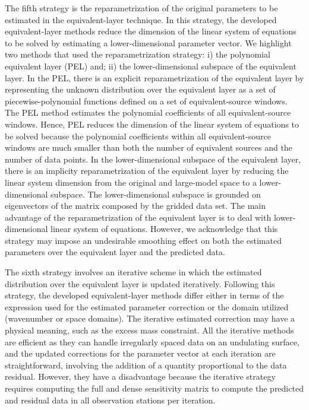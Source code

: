 \documentclass[utf8]{FrontiersinHarvard} %
\begin{document}
	The fifth strategy is the reparametrization of the original parameters to be estimated in the equivalent-layer technique.
	In this strategy, the developed equivalent-layer methods reduce 
	the dimension of the linear system of equations to be solved by 
	estimating a lower-dimensional parameter vector.
	We highlight two methods that used the reparametrization strategy:
	i) the polynomial equivalent layer (PEL) and; 
	ii) the lower-dimensional subspace of the equivalent layer.
	In the PEL, there  is an explicit reparametrization of the equivalent layer
	by representing the unknown distribution over the equivalent layer as a set of 
	piecewise-polynomial functions defined on a set of equivalent-source windows.
	The PEL method estimates the polynomial coefficients of all equivalent-source windows.
	Hence, PEL reduces the dimension of the linear system of equations to be solved because the polynomial coefficients within all equivalent-source windows 
	are much smaller than both the number of equivalent sources and the number of data points.
	In the lower-dimensional subspace of the equivalent layer, there  is an implicity  reparametrization of the equivalent layer by reducing the linear system dimension from the original and large-model space 
	to a lower-dimensional subspace.
	The lower-dimensional subspace is grounded on eigenvectors of the matrix composed by the gridded data set.
	The main advantage of the reparametrization of the equivalent layer is to deal with lower-dimensional  linear system of equations.
	However, we acknowledge that this strategy may impose an undesirable smoothing effect on both the estimated parameters over the equivalent layer and the predicted data.
	
	
	The sixth strategy involves an iterative scheme in which the estimated  distribution over the equivalent layer is updated iteratively. 
	Following this strategy, the developed equivalent-layer methods differ 
	either in terms of the expression used for the estimated parameter correction 
	or the domain utilized (wavenumber or space domains). 
	The iterative estimated correction may have a physical meaning, such as the excess mass constraint. 
	All the iterative methods are efficient as they can handle irregularly spaced data on an undulating surface, and the updated corrections for the parameter vector at each iteration are straightforward, involving the addition of a quantity proportional to the data residual.
	However, they have a disadvantage because the iterative strategy requires computing the full and dense sensitivity matrix to compute 
	the predicted and residual data in all observation stations per iteration.
	
\end{document}
